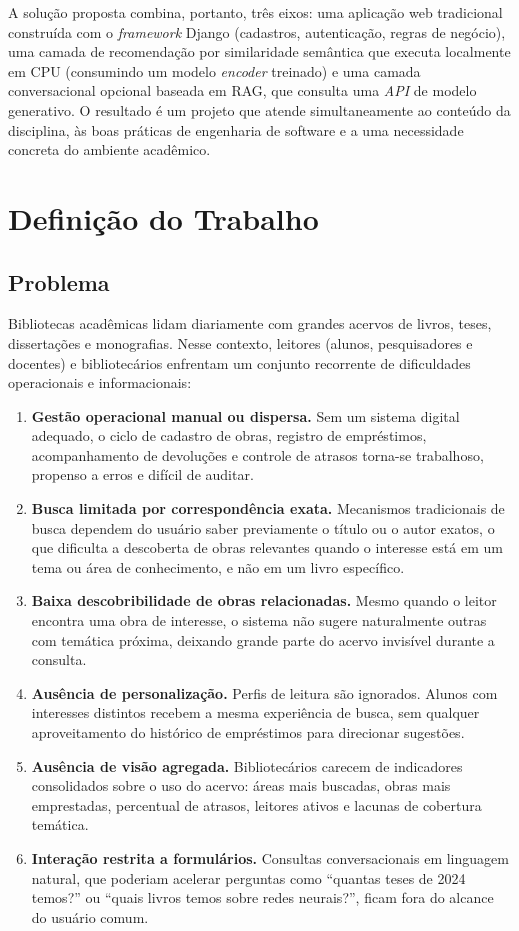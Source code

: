 \documentclass[monografia,abnt]{inf-ufg-modificado}
\begin{document}
A solução proposta combina, portanto, três eixos: uma aplicação web tradicional construída com o \textit{framework} Django (cadastros, autenticação, regras de negócio), uma camada de recomendação por similaridade semântica que executa localmente em CPU (consumindo um modelo \textit{encoder} treinado) e uma camada conversacional opcional baseada em RAG, que consulta uma \textit{API} de modelo generativo. O resultado é um projeto que atende simultaneamente ao conteúdo da disciplina, às boas práticas de engenharia de software e a uma necessidade concreta do ambiente acadêmico.

\chapter{Definição do Trabalho}

\section{Problema}

Bibliotecas acadêmicas lidam diariamente com grandes acervos de livros, teses, dissertações e monografias. Nesse contexto, leitores (alunos, pesquisadores e docentes) e bibliotecários enfrentam um conjunto recorrente de dificuldades operacionais e informacionais:

\begin{enumerate}
    \item \textbf{Gestão operacional manual ou dispersa.} Sem um sistema digital adequado, o ciclo de cadastro de obras, registro de empréstimos, acompanhamento de devoluções e controle de atrasos torna-se trabalhoso, propenso a erros e difícil de auditar.
    \item \textbf{Busca limitada por correspondência exata.} Mecanismos tradicionais de busca dependem do usuário saber previamente o título ou o autor exatos, o que dificulta a descoberta de obras relevantes quando o interesse está em um tema ou área de conhecimento, e não em um livro específico.
    \item \textbf{Baixa descobribilidade de obras relacionadas.} Mesmo quando o leitor encontra uma obra de interesse, o sistema não sugere naturalmente outras com temática próxima, deixando grande parte do acervo invisível durante a consulta.
    \item \textbf{Ausência de personalização.} Perfis de leitura são ignorados. Alunos com interesses distintos recebem a mesma experiência de busca, sem qualquer aproveitamento do histórico de empréstimos para direcionar sugestões.
    \item \textbf{Ausência de visão agregada.} Bibliotecários carecem de indicadores consolidados sobre o uso do acervo: áreas mais buscadas, obras mais emprestadas, percentual de atrasos, leitores ativos e lacunas de cobertura temática.
    \item \textbf{Interação restrita a formulários.} Consultas conversacionais em linguagem natural, que poderiam acelerar perguntas como ``quantas teses de 2024 temos?'' ou ``quais livros temos sobre redes neurais?'', ficam fora do alcance do usuário comum.
\end{enumerate}
\end{document}
